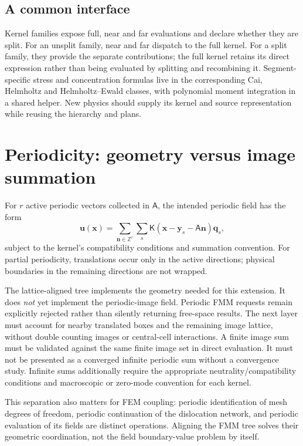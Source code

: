 \subsection{A common interface}
Kernel families expose full, near and far evaluations and declare whether
they are split. For an unsplit family, near and far dispatch to the full
kernel. For a split family, they provide the separate contributions; the full
kernel retains its direct expression rather than being evaluated by splitting
and recombining it. Segment-specific stress and concentration formulas live
in the corresponding Cai, Helmholtz and Helmholtz--Ewald classes, with
polynomial moment integration in a shared helper. New physics should supply
its kernel and source representation while reusing the hierarchy and plans.

\section{Periodicity: geometry versus image summation}
For $r$ active periodic vectors collected in $\mathsf A$, the intended periodic
field has the form
\begin{equation}
 \bm u(\bm x)=\sum_{\bm n\in\mathbb Z^r}\sum_s
 \mathsf K(\bm x-\bm y_s-\mathsf A\bm n)\bm q_s,
\end{equation}
subject to the kernel's compatibility conditions and summation convention.
For partial periodicity, translations occur only in the active directions;
physical boundaries in the remaining directions are not wrapped.

The lattice-aligned tree implements the geometry needed for this extension.
It does \emph{not} yet implement the periodic-image field. Periodic FMM
requests remain explicitly rejected rather than silently returning free-space
results. The next layer must account for nearby translated boxes and the
remaining image lattice, without double counting images or central-cell
interactions. A finite image sum must be validated against the same finite
image set in direct evaluation. It must not be presented as a converged
infinite periodic sum without a convergence study. Infinite sums additionally
require the appropriate neutrality/compatibility conditions and macroscopic
or zero-mode convention for each kernel.

This separation also matters for FEM coupling: periodic identification of
mesh degrees of freedom, periodic continuation of the dislocation network,
and periodic evaluation of its fields are distinct operations. Aligning the
FMM tree solves their geometric coordination, not the field boundary-value
problem by itself.
